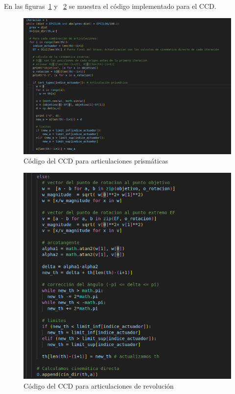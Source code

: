 En las figuras~\ref{chapter:code_ccd1} y ~\ref{chapter:code_ccd2} se muestra el código implementado para el CCD.
\begin{figure}[htb]
   \centering
   \includegraphics[width=1\linewidth]{images/ccd_1.png}
   \caption{Código del CCD para articulaciones prismáticas}
   \label{chapter:code_ccd1}
\end{figure}
\begin{figure}[htb]
   \centering
   \includegraphics[width=1\linewidth]{images/ccd_2.png}
   \caption{Código del CCD para articulaciones de revolución}
   \label{chapter:code_ccd2}
\end{figure}


